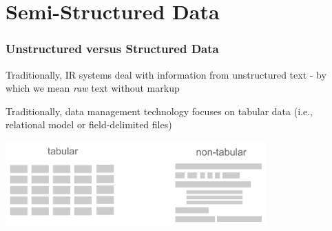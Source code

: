 \documentclass[svgnames]{beamer}
\begin{document}
\section{Semi-Structured Data}


\begin{frame}
\frametitle{Unstructured versus Structured Data}

\begin{block}{}
Traditionally, IR systems deal with information from unstructured text - by which we mean {\it raw} text without markup
\end{block}

\begin{block}{}
Traditionally, data management technology focuses on tabular data (i.e., relational model or field-delimited files)
\end{block}

\begin{center}
\includegraphics[width=10cm]{tabular_nontabular.pdf}
\end{center}

\end{frame}

\end{document}
